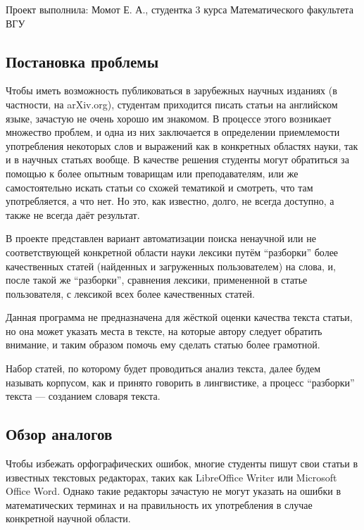 \documentclass[a4paper,openbib]{report}
\begin{document}
{}

Проект выполнила: Момот Е. А., студентка 3 курса Математического факультета ВГУ

\subsection*{Постановка проблемы}

Чтобы иметь возможность публиковаться в зарубежных научных изданиях (в частности, на arXiv.org), студентам приходится писать статьи на английском языке, 
зачастую не очень хорошо им знакомом. В процессе этого возникает множество проблем, и одна из них заключается в определении приемлемости 
употребления некоторых слов и выражений как в конкретных областях науки, так и в научных статьях вообще. В качестве решения студенты могут обратиться 
за помощью к более опытным товарищам или преподавателям, или же самостоятельно искать статьи со схожей тематикой и смотреть, что там употребляется, а 
что нет. Но это, как известно, долго, не всегда доступно, а также не всегда даёт результат.

В проекте представлен вариант автоматизации поиска ненаучной или не соответствующей конкретной области науки лексики путём ``разборки'' более 
качественных статей (найденных и загруженных пользователем) на слова, и, после такой же ``разборки'', сравнения лексики, примененной в статье 
пользователя, с лексикой всех более качественных статей.

Данная программа не предназначена для жёсткой оценки качества текста статьи, но она может указать места в тексте, на которые автору следует 
обратить внимание, и таким образом помочь ему сделать статью более грамотной.

Набор статей, по которому будет проводиться анализ текста, далее будем называть корпусом, как и принято говорить в лингвистике, а процесс 
``разборки'' текста --- созданием словаря текста.

\subsection*{Обзор аналогов}

Чтобы избежать орфографических ошибок, многие студенты пишут свои статьи в известных текстовых редакторах, таких как LibreOffice Writer или Microsoft Office Word.
Однако такие редакторы зачастую не могут указать на ошибки в математических терминах и на правильность их употребления в случае конкретной научной области. 
\end{document}
